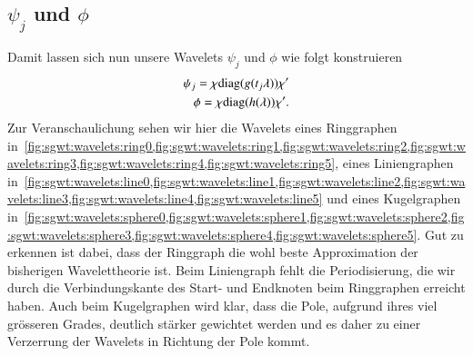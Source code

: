 \subsection{\texorpdfstring{$\psi_j$}{psi} und \texorpdfstring{$\phi$}{phi}}
Damit lassen sich nun unsere Wavelets $\psi_j$ und $\phi$ wie folgt konstruieren
\begin{align}
\psi_j = \chi \diag{g(t_j\lambda)} \chi' 
\label{eq:sgwt:psi}
\\
\phi = \chi \diag{h(\lambda)} \chi'.
\label{eq:sgwt:phi}
\end{align}
Zur Veranschaulichung sehen wir hier die Wavelets eines Ringgraphen 
in~\cref{fig:sgwt:wavelets:ring0,fig:sgwt:wavelets:ring1,fig:sgwt:wavelets:ring2,fig:sgwt:wavelets:ring3,fig:sgwt:wavelets:ring4,fig:sgwt:wavelets:ring5},
 eines Liniengraphen 
in~\cref{fig:sgwt:wavelets:line0,fig:sgwt:wavelets:line1,fig:sgwt:wavelets:line2,fig:sgwt:wavelets:line3,fig:sgwt:wavelets:line4,fig:sgwt:wavelets:line5}
 und eines Kugelgraphen 
in~\cref{fig:sgwt:wavelets:sphere0,fig:sgwt:wavelets:sphere1,fig:sgwt:wavelets:sphere2,fig:sgwt:wavelets:sphere3,fig:sgwt:wavelets:sphere4,fig:sgwt:wavelets:sphere5}.
Gut zu erkennen ist dabei, dass der Ringgraph die wohl beste Approximation der 
bisherigen Wavelettheorie ist. Beim Liniengraph fehlt die Periodisierung, die 
wir durch die Verbindungskante des Start- und Endknoten beim Ringgraphen 
erreicht haben. Auch beim Kugelgraphen wird klar, dass die Pole, aufgrund ihres 
viel gr\"osseren Grades, deutlich st\"arker gewichtet werden und es daher zu 
einer Verzerrung der Wavelets in Richtung der Pole kommt.

